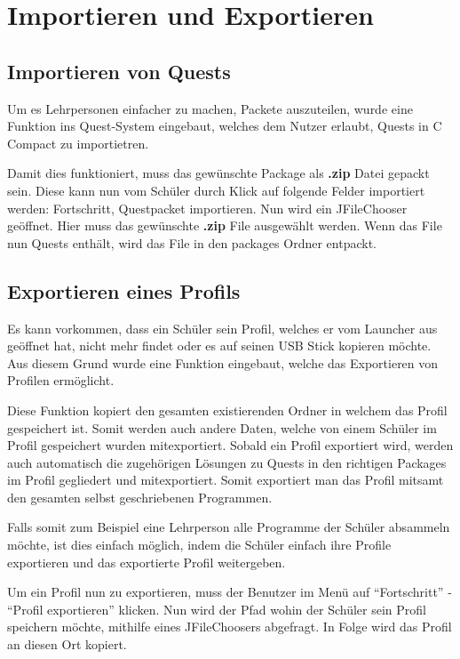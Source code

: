 \section{Importieren und Exportieren}
\subsection{Importieren von Quests}
\label{sec:quest-import}
Um es Lehrpersonen einfacher zu machen, Packete auszuteilen, wurde eine Funktion ins Quest-System eingebaut, welches dem Nutzer erlaubt, Quests in C Compact zu importietren.

Damit dies funktioniert, muss das gewünschte Package als \textbf{.zip} Datei gepackt sein. Diese kann nun vom Schüler durch Klick auf folgende Felder importiert werden: Fortschritt, Questpacket importieren. Nun wird ein JFileChooser geöffnet. Hier muss das gewünschte \textbf{.zip} File ausgewählt werden. Wenn das File nun Quests enthält, wird das File in den packages Ordner entpackt.

\subsection{Exportieren eines Profils}
\label{sec:quest-export}
Es kann vorkommen, dass ein Schüler sein Profil, welches er vom Launcher aus geöffnet hat, nicht mehr findet oder es auf seinen USB Stick kopieren möchte. Aus diesem Grund wurde eine Funktion eingebaut, welche das Exportieren von Profilen ermöglicht.

Diese Funktion kopiert den gesamten existierenden Ordner in welchem das Profil gespeichert ist. Somit werden auch andere Daten, welche von einem Schüler im Profil gespeichert wurden mitexportiert. Sobald ein Profil exportiert wird, werden auch automatisch die zugehörigen Lösungen zu Quests in den richtigen Packages im Profil gegliedert und mitexportiert. Somit exportiert man das Profil mitsamt den gesamten selbst geschriebenen Programmen.

Falls somit zum Beispiel eine Lehrperson alle Programme der Schüler absammeln möchte, ist dies einfach möglich, indem die Schüler einfach ihre Profile exportieren und das exportierte Profil weitergeben.

Um ein Profil nun zu exportieren, muss der Benutzer im Menü auf "`Fortschritt"' - "`Profil exportieren"' klicken. Nun wird der Pfad wohin der Schüler sein Profil speichern möchte, mithilfe eines JFileChoosers abgefragt. In Folge wird das Profil an diesen Ort kopiert.
